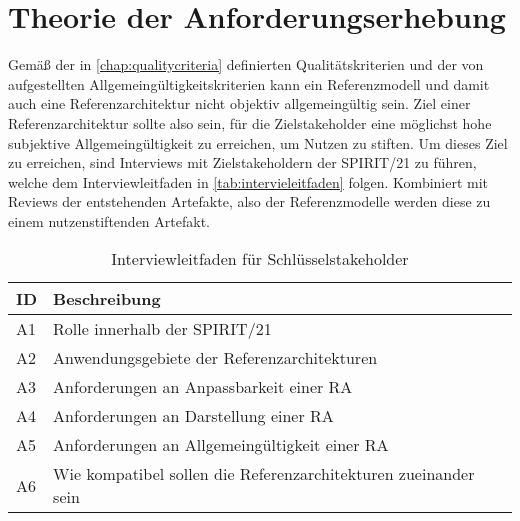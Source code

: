 \section{Theorie der Anforderungserhebung}
Gemäß der in \autoref{chap:qualitycriteria} definierten Qualitätskriterien und der von \citeauthor{vomBrocke.2003} aufgestellten Allgemeingültigkeitskriterien kann ein Referenzmodell und damit auch eine Referenzarchitektur nicht objektiv allgemeingültig sein. Ziel einer Referenzarchitektur sollte also sein, für die Zielstakeholder eine möglichst hohe subjektive Allgemeingültigkeit zu erreichen, um Nutzen zu stiften. Um dieses Ziel zu erreichen, sind Interviews mit Zielstakeholdern der SPIRIT/21 zu führen, welche dem Interviewleitfaden in \autoref{tab:intervieleitfaden} folgen. Kombiniert mit Reviews der entstehenden Artefakte, also der Referenzmodelle werden diese zu einem nutzenstiftenden Artefakt.

\begin{table}[H]
\centering
\begin{tabular}{|l|l|}
\hline
ID & Beschreibung \\ \hline
A1 & Rolle innerhalb der SPIRIT/21 \\ \hline
A2 & Anwendungsgebiete der Referenzarchitekturen \\ \hline
A3 & Anforderungen an Anpassbarkeit einer RA \\ \hline
A4 & Anforderungen an Darstellung einer RA \\ \hline
A5 & Anforderungen an Allgemeingültigkeit einer RA \\ \hline
A6 & Wie kompatibel sollen die Referenzarchitekturen zueinander sein \\ \hline
\end{tabular}
\caption{Interviewleitfaden für Schlüsselstakeholder}
\label{tab:intervieleitfaden}
\end{table}